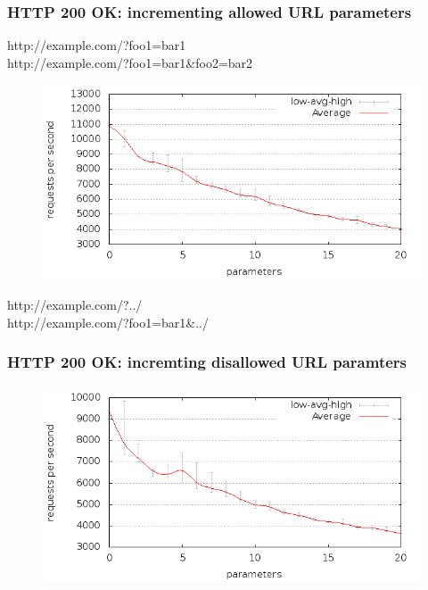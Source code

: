 \begin{frame}[noframenumbering]
  \frametitle{HTTP 200 OK: incrementing allowed URL parameters}

  \mbox{http://example.com/?foo1=bar1}\\
  \mbox{http://example.com/?foo1=bar1\&foo2=bar2}

  \begin{figure}[H]
  \centering
  \includegraphics[scale=0.5] {../paper/images/results/200_with_naxsi_incremented_allowed_parameters/output.png}
  \end{figure}
\end{frame}

\begin{frame}[noframenumbering]
  \mbox{http://example.com/?../}\\
  \mbox{http://example.com/?foo1=bar1\&../}

  \frametitle{HTTP 200 OK: incremting disallowed URL paramters}
  \begin{figure}[H]
  \centering
  \includegraphics[scale=0.5] {../paper/images/results/200_with_naxsi_incremented_disallowed_parameters/output.png}
  \end{figure}
\end{frame}

